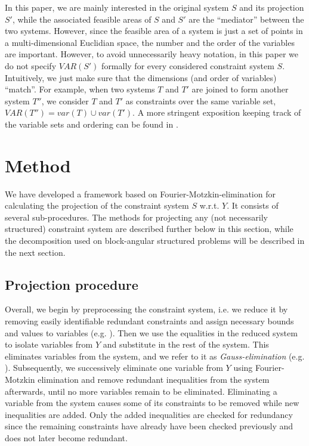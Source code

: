 In this paper, we are mainly interested in the original system $S$ and its projection $S'$, while the associated feasible areas of $S$ and $S'$ are the ``mediator'' between the two systems. 
However, since the feasible area of a system is just a set of points in a multi-dimensional Euclidian space, the number and the order of the variables are important. However, to avoid unnecessarily heavy notation, in this paper we do not specify $VAR(S')$ formally for every considered constraint system $S$.
Intuitively, we just make sure that the dimensions (and order of variables) ``match''. For example, when two systems $T$ and $T'$ are joined to form another system $T''$, we consider $T$ and $T'$ as constraints over the same variable set, $VAR(T'')=var(T)\cup var(T')$.
A more stringent exposition keeping track of the variable sets and ordering can be found in \cite{MyTechRep}.

\section{Method}\label{sec:methods}
We have developed a framework based on Fourier-Motzkin-elimination for calculating the projection of the constraint system $S$ w.r.t. $Y$. It 
consists of several sub-procedures. The methods for projecting any (not necessarily structured) constraint system are described further below in this section, while the decomposition used on block-angular structured problems will be described in the next section.

\subsection{Projection procedure}
Overall, we begin by preprocessing the constraint system, i.e. we reduce it by removing easily identifiable redundant constraints and assign necessary bounds and values to variables (e.g. \cite{brearley75,andersen95,maros}).
Then we use the equalities in the reduced system to isolate variables from $Y$ and substitute in the rest of the system. This eliminates variables from the system, and we refer to it as \emph{Gauss-elimination} (e.g. \cite{duffin74,simon05}).  
Subsequently, we successively eliminate one variable from $Y$ using Fourier-Motzkin elimination and remove redundant inequalities from the system afterwards, until no more variables remain to be eliminated. Eliminating a variable from the system causes some of its constraints to be removed while new inequalities are added. Only the added inequalities are checked for redundancy since the remaining constraints have already have been checked previously and does not later become redundant. 

